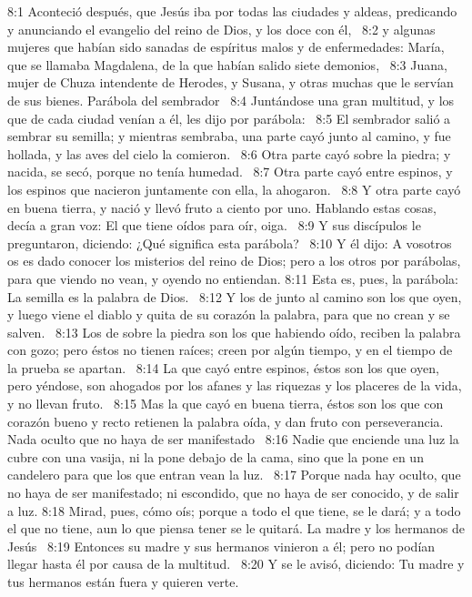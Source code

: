 8:1 Aconteció después, que Jesús iba por todas las ciudades y aldeas, predicando y anunciando el evangelio del reino de Dios, y los doce con él,  
8:2 y algunas mujeres que habían sido sanadas de espíritus malos y de enfermedades: María, que se llamaba Magdalena, de la que habían salido siete demonios,  
8:3 Juana, mujer de Chuza intendente de Herodes, y Susana, y otras muchas que le servían de sus bienes. 
Parábola del sembrador   
8:4 Juntándose una gran multitud, y los que de cada ciudad venían a él, les dijo por parábola:  
8:5 El sembrador salió a sembrar su semilla; y mientras sembraba, una parte cayó junto al camino, y fue hollada, y las aves del cielo la comieron.  
8:6 Otra parte cayó sobre la piedra; y nacida, se secó, porque no tenía humedad.  
8:7 Otra parte cayó entre espinos, y los espinos que nacieron juntamente con ella, la ahogaron.  
8:8 Y otra parte cayó en buena tierra, y nació y llevó fruto a ciento por uno. Hablando estas cosas, decía a gran voz: El que tiene oídos para oír, oiga.  
8:9 Y sus discípulos le preguntaron, diciendo: ¿Qué significa esta parábola?  
8:10 Y él dijo: A vosotros os es dado conocer los misterios del reino de Dios; pero a los otros por parábolas, para que viendo no vean, y oyendo no entiendan. 
8:11 Esta es, pues, la parábola: La semilla es la palabra de Dios.  
8:12 Y los de junto al camino son los que oyen, y luego viene el diablo y quita de su corazón la palabra, para que no crean y se salven.  
8:13 Los de sobre la piedra son los que habiendo oído, reciben la palabra con gozo; pero éstos no tienen raíces; creen por algún tiempo, y en el tiempo de la prueba se apartan.  
8:14 La que cayó entre espinos, éstos son los que oyen, pero yéndose, son ahogados por los afanes y las riquezas y los placeres de la vida, y no llevan fruto.  
8:15 Mas la que cayó en buena tierra, éstos son los que con corazón bueno y recto retienen la palabra oída, y dan fruto con perseverancia.  
Nada oculto que no haya de ser manifestado  
8:16 Nadie que enciende una luz la cubre con una vasija, ni la pone debajo de la cama, sino que la pone en un candelero para que los que entran vean la luz.  
8:17 Porque nada hay oculto, que no haya de ser manifestado; ni escondido, que no haya de ser conocido, y de salir a luz. 
8:18 Mirad, pues, cómo oís; porque a todo el que tiene, se le dará; y a todo el que no tiene, aun lo que piensa tener se le quitará. 
La madre y los hermanos de Jesús   
8:19 Entonces su madre y sus hermanos vinieron a él; pero no podían llegar hasta él por causa de la multitud.  
8:20 Y se le avisó, diciendo: Tu madre y tus hermanos están fuera y quieren verte.  
